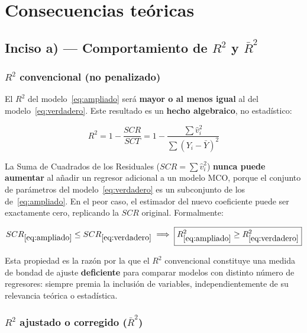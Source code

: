 \documentclass[12pt, letterpaper]{article}
\begin{document}
\section{Consecuencias teóricas}

\subsection{Inciso a) --- Comportamiento de $R^2$ y $\bar{R}^2$}

\subsubsection{$R^2$ convencional (no penalizado)}

El $R^2$ del modelo~\eqref{eq:ampliado} será \textbf{mayor o al menos igual}
al del modelo~\eqref{eq:verdadero}. Este resultado es un \textbf{hecho
algebraico}, no estadístico:

\begin{equation}
  R^2 = 1 - \frac{SCR}{SCT} = 1 - \frac{\sum \hat{v}_i^2}{\sum(Y_i - \bar{Y})^2}
\end{equation}

La Suma de Cuadrados de los Residuales ($SCR = \sum \hat{v}_i^2$) \textbf{nunca
puede aumentar} al añadir un regresor adicional a un modelo MCO, porque el
conjunto de parámetros del modelo~\eqref{eq:verdadero} es un subconjunto de
los de~\eqref{eq:ampliado}. En el peor caso, el estimador del nuevo
coeficiente puede ser exactamente cero, replicando la $SCR$ original.
Formalmente:

\begin{equation}
  SCR_{\eqref{eq:ampliado}} \leq SCR_{\eqref{eq:verdadero}}
  \implies
  \boxed{R^2_{\eqref{eq:ampliado}} \geq R^2_{\eqref{eq:verdadero}}}
\end{equation}

Esta propiedad es la razón por la que el $R^2$ convencional constituye una
medida de bondad de ajuste \textbf{deficiente} para comparar modelos con
distinto número de regresores: siempre premia la inclusión de variables,
independientemente de su relevancia teórica o estadística.

\subsubsection{$R^2$ ajustado o corregido ($\bar{R}^2$)}
\end{document}
